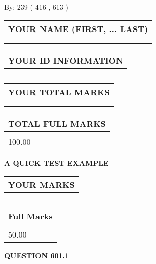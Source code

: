 \documentclass[12pt]{article}
\begin{document}
   
\hspace{1.0in} By: 
 239 ( 416 ,  613 )
   
   
   
   
\newpage 
\setcounter{page}{ 
   601001 } 
   
   
   
   
\noindent\begin{tabular}{|l|}
\hline
YOUR NAME (FIRST, ... LAST)  \\
\hline
 \\ 
 \\ 
\hline
\end{tabular}
\hspace{0.05in} \begin{tabular}{|l|}
\hline
 YOUR   ID   INFORMATION  \\
\hline
 \\ 
 \\ 
\hline
\end{tabular}
   
   
\vspace{0.2in}\noindent\begin{tabular}{|l|}
\hline
YOUR TOTAL MARKS  \\
\hline
 \\ 
 \\ 
\hline
\end{tabular}
\hspace{0.05in} \begin{tabular}{|l|}
\hline
TOTAL FULL MARKS  \\
\hline
 \\ 
100.00 \\
\hline
\end{tabular}
   
   
 \vspace{0.2in}
{\LARGE {\textbf{ A QUICK TEST EXAMPLE}}}
   
   
  
\vspace{0.2in}
  
\noindent\begin{tabular}{|l|}
\hline
 YOUR MARKS  \\
\hline
 \\ 
 \\ 
\hline
\end{tabular}
\hspace{0.05in} \begin{tabular}{|l|}
\hline
 Full Marks  \\
\hline
 \\ 
50.00 \\
\hline
\end{tabular}
{\textbf{\Large{QUESTION
601.1 
}}}
  
\end{document}
